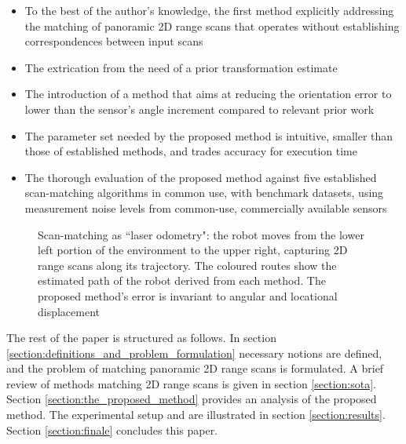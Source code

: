 \begin{itemize}
  \item To the best of the author's knowledge, the first method explicitly
        addressing the matching of panoramic 2D range scans that operates
        without establishing correspondences between input scans
  \item The extrication from the need of a prior transformation estimate
  \item The introduction of a method that aims at reducing the orientation
        error to lower than the sensor's angle increment compared to relevant
        prior work
  \item The parameter set needed by the proposed method is intuitive, smaller
        than those of established methods, and trades accuracy for execution
        time
  \item The thorough evaluation of the proposed method against five established
        scan-matching algorithms in common use, with benchmark datasets,
        using measurement noise levels from common-use, commercially available
        sensors
\end{itemize}

\begin{figure}[]\centering
  \vspace{-1.3cm}
  
  \vspace{-2cm}
  \caption{\small Scan-matching as ``laser odometry": the robot moves from the
           lower left portion of the environment to the upper right, capturing
           2D range scans along its trajectory. The coloured routes show the
           estimated path of the robot derived from each method. The proposed
           method's error is invariant to angular and locational displacement}
  \label{fig:laser_odometry}
\end{figure}

The rest of the paper is structured as follows. In section
\ref{section:definitions_and_problem_formulation} necessary notions are defined,
and the problem of matching panoramic 2D range scans is formulated. A brief
review of methods matching 2D range scans is given in section
\ref{section:sota}. Section \ref{section:the_proposed_method} provides an
analysis of the proposed method. The experimental setup and are
illustrated in section \ref{section:results}. Section \ref{section:finale}
concludes this paper.
